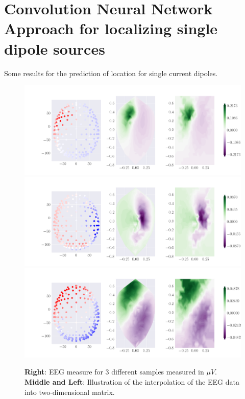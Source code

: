 \documentclass[a4paper, UKenglish, 11pt]{uiomaster}
\begin{document}
\section{Convolution Neural Network Approach for localizing single dipole sources}

Some results for the prediction of location for single current dipoles.


\begin{figure}[!htb]
\centering
\includegraphics[width=\linewidth]{../Code/plots/finals/new_eeg_dipole_pos_0.png}
\includegraphics[width=\linewidth]{../Code/plots/finals/new_eeg_dipole_pos_4.png}
\includegraphics[width=\linewidth]{../Code/plots/finals/new_eeg_dipole_pos_6.png}

\caption{\newline
\textbf{Right}: EEG measure for 3 different samples measured in $\mu V$. \newline
\textbf{Middle and Left}: Illustration of the interpolation of the EEG data into two-dimensional matrix.}
\label{fig:eeg_dipole_pos_0}

\end{figure}
\end{document}
